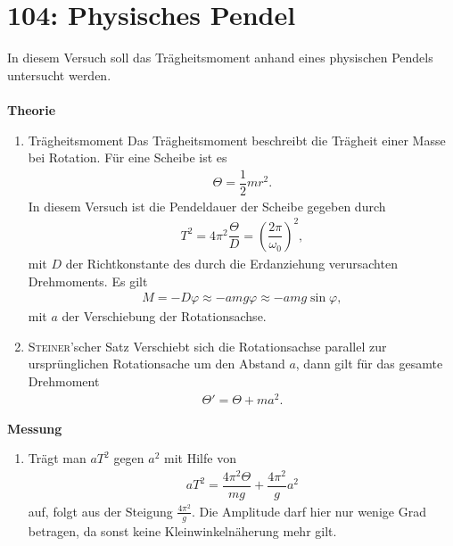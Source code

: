 \section{104: Physisches Pendel}
In diesem Versuch soll das Trägheitsmoment anhand eines physischen Pendels untersucht werden.\\\\
\textbf{Theorie} 
\begin{enumerate}[label=--]
        \item Trägheitsmoment \hspace{25pt} 
                Das Trägheitsmoment beschreibt die Trägheit einer Masse bei Rotation.
                Für eine Scheibe ist es
                \begin{align} 
                        \Theta =\dfrac{1}{2}mr^2
                .\end{align} 
                In diesem Versuch ist die Pendeldauer der Scheibe gegeben durch
                \begin{align} 
                        T^2=4\pi ^2\dfrac{\Theta }{D}=\left(\dfrac{2\pi }{\omega _0}\right)^2
                ,\end{align} 
                mit $D$ der Richtkonstante des durch die Erdanziehung verursachten Drehmoments. 
                Es gilt
                \begin{align} 
                        M=-D\varphi \approx -amg\varphi \approx -amg\sin \varphi 
                ,\end{align} 
                mit $a$ der Verschiebung der Rotationsachse. 
        \item \textsc{Steiner}'scher Satz \hspace{25pt} 
                Verschiebt sich die Rotationsachse parallel zur ursprünglichen Rotationsache um den Abstand $a$, dann gilt für das gesamte Drehmoment
                \begin{align} 
                        \Theta '=\Theta +ma^2
                .\end{align} 
\end{enumerate}
\textbf{Messung} 
\begin{enumerate}[label=--]
        \item Trägt man $aT^2$ gegen $a^2$ mit Hilfe von
                \begin{align} 
                        aT^2=\dfrac{4\pi ^2\Theta }{mg}+\dfrac{4\pi ^2}{g}a^2
                \end{align} 
                auf, folgt aus der Steigung $\tfrac{4\pi ^2}{g}$.
                Die Amplitude darf hier nur wenige Grad betragen, da sonst keine Kleinwinkelnäherung mehr gilt.
\end{enumerate}

